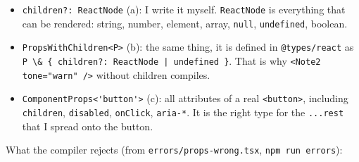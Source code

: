 \begin{itemize}
\tightlist
\item
  \passthrough{\lstinline!children?: ReactNode!} (a): I write it myself. \passthrough{\lstinline!ReactNode!} is everything that can be rendered: string, number, element, array, \passthrough{\lstinline!null!}, \passthrough{\lstinline!undefined!}, boolean.
\item
  \passthrough{\lstinline!PropsWithChildren<P>!} (b): the same thing, it is defined in \passthrough{\lstinline!@types/react!} as \passthrough{\lstinline!P \& \{ children?: ReactNode | undefined \}!}. That is why \passthrough{\lstinline!<Note2 tone="warn" />!} without children compiles.
\item
  \passthrough{\lstinline!ComponentProps<'button'>!} (c): all attributes of a real \passthrough{\lstinline!<button>!}, including \passthrough{\lstinline!children!}, \passthrough{\lstinline!disabled!}, \passthrough{\lstinline!onClick!}, \passthrough{\lstinline!aria-*!}. It is the right type for the \passthrough{\lstinline!...rest!} that I spread onto the button.
\end{itemize}

What the compiler rejects (from \passthrough{\lstinline!errors/props-wrong.tsx!}, \passthrough{\lstinline!npm run errors!}):

